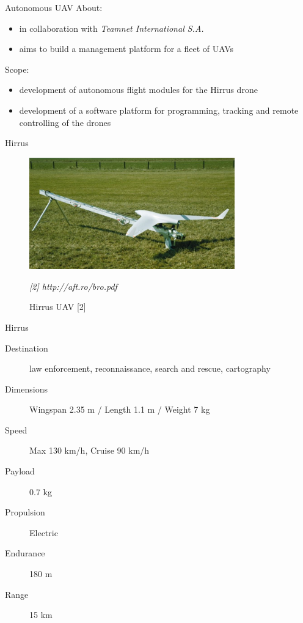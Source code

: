 \documentclass{beamer}
\begin{document}
\begin{frame}{Autonomous UAV}
About:
\begin{itemize}
\item in collaboration with \textit{Teamnet International S.A.}
\item aims to build a management platform for a fleet of UAVs
\end{itemize}
Scope:
\begin{itemize}
\item development of autonomous flight modules for the Hirrus drone
\item development of a software platform for programming, tracking and remote
controlling of the drones
\end{itemize}
\end{frame}

\begin{frame}{Hirrus}
\begin{center}
\begin{figure}[p]
\includegraphics[width=3.5in]{img/hirrus.jpg}
\caption{Hirrus UAV [2]}
\textit{[2] http://aft.ro/bro.pdf}
\end{figure}
\end{center}
\end{frame}

\begin{frame}{Hirrus}

\begin{description}
\item [Destination] law enforcement, reconnaissance, search and rescue, cartography
\item [Dimensions] Wingspan 2.35 m / Length 1.1 m / Weight 7 kg
\item [Speed] Max 130 km/h, Cruise 90 km/h
\item [Payload] 0.7 kg
\item [Propulsion] Electric
\item [Endurance] 180 m
\item [Range] 15 km
\end{description}

\end{frame}
\end{document}
